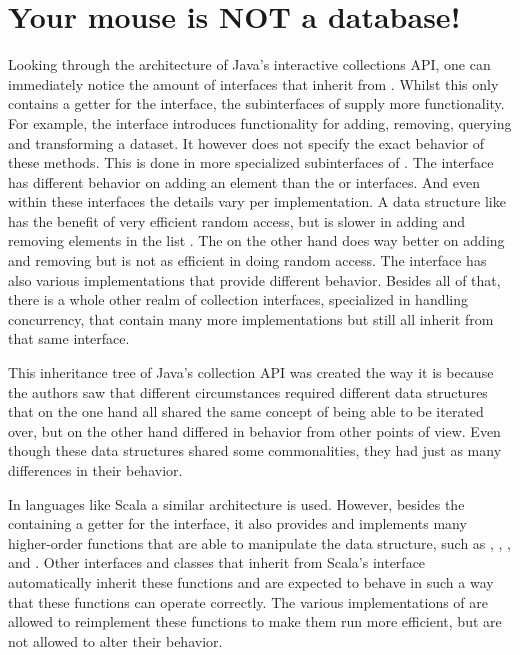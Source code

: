 \section{Your mouse is NOT a database!}
\label{sec:your-mouse-is-not-a-database}
Looking through the architecture of Java's interactive collections API, one can immediately notice the amount of interfaces that inherit from \itb \cite{java-iterable-api}. Whilst this \itb only contains a getter for the \itr interface, the subinterfaces of \itb supply more functionality. For example, the  interface introduces functionality for adding, removing, querying and transforming a dataset. It however does not specify the exact behavior of these methods. This is done in more specialized subinterfaces of . The  interface has different behavior on adding an element than the  or  interfaces. And even within these interfaces the details vary per implementation. A data structure like  has the benefit of very efficient random access, but is slower in adding and removing elements in the list \cite{linkedlist-vs-arraylist}. The  on the other hand does way better on adding and removing but is not as efficient in doing random access. The  interface has also various implementations that provide different behavior. Besides all of that, there is a whole other realm of collection interfaces, specialized in handling concurrency, that contain many more implementations but still all inherit from that same \itb interface.

This inheritance tree of Java's collection API was created the way it is because the authors saw that different circumstances required different data structures that on the one hand all shared the same concept of being able to be iterated over, but on the other hand differed in behavior from other points of view. Even though these data structures shared some commonalities, they had just as many differences in their behavior.

In languages like Scala a similar architecture is used. However, besides the \itb containing a getter for the \itr interface, it also provides and implements many higher-order functions that are able to manipulate the data structure, such as , , ,  and . Other interfaces and classes that inherit from Scala's \itb interface automatically inherit these functions and are expected to behave in such a way that these functions can operate correctly. The various implementations of \itb are allowed to reimplement these functions to make them run more efficient, but are not allowed to alter their behavior.

